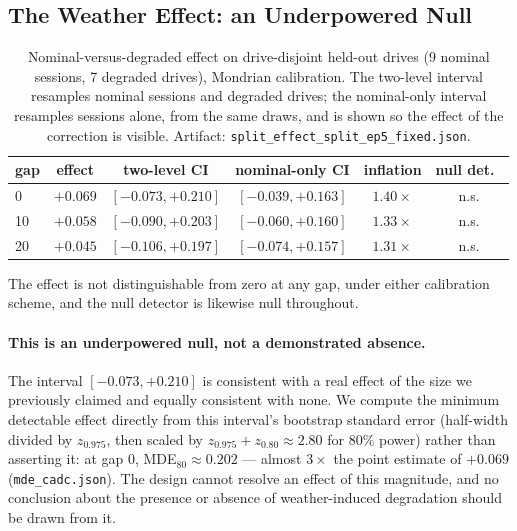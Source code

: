 \subsection{The Weather Effect: an Underpowered Null}
\label{sec:underpowered}

\begin{table}[t]
\centering
\caption{Nominal-versus-degraded effect on drive-disjoint held-out drives
(9 nominal sessions, 7 degraded drives), Mondrian calibration. The
two-level interval resamples nominal sessions and degraded drives; the
nominal-only interval resamples sessions alone, from the same draws, and is
shown so the effect of the correction is visible. Artifact:
\texttt{split\_effect\_split\_ep5\_fixed.json}.}
\label{tab:underpowered}
\small
\begin{tabular}{@{}lccccc@{}}
\toprule
gap & effect & two-level CI & nominal-only CI & inflation & null det.\ \\
\midrule
0 & $+0.069$ & $[-0.073, +0.210]$ & $[-0.039, +0.163]$ & $1.40\times$ & n.s. \\
10 & $+0.058$ & $[-0.090, +0.203]$ & $[-0.060, +0.160]$ & $1.33\times$ & n.s. \\
20 & $+0.045$ & $[-0.106, +0.197]$ & $[-0.074, +0.157]$ & $1.31\times$ & n.s. \\
\bottomrule
\end{tabular}
\end{table}

The effect is not distinguishable from zero at any gap, under either
calibration scheme, and the null detector is likewise null throughout.

\begin{sloppypar}
\paragraph{This is an underpowered null, not a demonstrated absence.} The
interval $[-0.073, +0.210]$ is consistent with a real effect of the size we
previously claimed and equally consistent with none. We compute the
minimum detectable effect directly from this interval's bootstrap standard
error (half-width divided by $z_{0.975}$, then scaled by
$z_{0.975} + z_{0.80} \approx 2.80$ for 80\% power) rather than asserting
it: at gap $0$, MDE$_{80} \approx 0.202$ --- almost $3\times$ the point
estimate of $+0.069$ (\texttt{mde\_cadc.json}). The design cannot resolve an
effect of this magnitude, and no conclusion about the presence or absence
of weather-induced degradation should be drawn from it.
\end{sloppypar}

